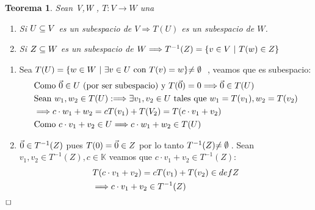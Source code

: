 \documentclass[]{article}
\newtheorem{theorem}{Teorema}
\newenvironment{proof}{\noindent{\bf Prueba:}}{$\hfill \Box$ \vspace{10pt}}
\newcommand{\K}{
    \mathbb{K}
}
\newcommand{\ida}{\Longrightarrow}
\begin{document}
\begin{theorem}
    Sean V,W \espvec , $T:V\to W$ una \tl
    \begin{enumerate}
        \item Si $\text{$U \subseteq V$}$ es un subespacio de $V \ida T(U)$ es un subespacio de $W$.
        \item Si $\text{$Z \subseteq W$}$ es un subespacio de $W \ida T^{-1}(Z)=\conjunto{v \in V \tq T(w)\in Z}$
    \end{enumerate}
\end{theorem}
\begin{proof}
    \begin{enumerate}
        \item Sea $\text{$T({U})$} = \text{$\{ {w \in W \text{ $|$ } \exists v \in U \text{ con } \text{$T({v})$}=w} \}$} \text{$\neq\emptyset$}\:$ , veamos
        que  es subespacio:
        \begin{align*}
            &\text{Como } \cero \in U \text{ (por ser subespacio) y } \T{\cero}=0 \ida \cero \in \T{U}\\
            &\text{Sean } w_1,w_2 \in \T{U}: \ida \exists v_1,v_2 \in U \text{ tales que } w_1=\T{v_1},w_2=\T{v_2}\\
            &\ida c\cdot w_1 + w_2 = c\T{v_1}+\T{V_2} = \T{c\cdot v_1 + v_2}\\
            &\text{Como } c\cdot v_1+v_2 \in U \ida c\cdot w_1 + w_2 \in \T{U}
        \end{align*}
        \item $\text{$\vec{0}$} \in T^{-1}(Z)$ pues $\text{$T({0})$} = \text{$\vec{0}$} \in Z$ por lo tanto $T^{-1}(Z) \text{$\neq\emptyset$}\:$.
        Sean $v_1,v_2 \in T^{-1}(Z) , c \in \K$ veamos que $c\cdot v_1 + v_2 \in T^{-1}(Z)$:
        \begin{align*}
            &\T{c\cdot v_1+v_2}=c\T{v_1}+\T{v_2} \in defZ\\
            &\ida c\cdot v_1+v_2 \in T^{-1}(Z)
        \end{align*}
    \end{enumerate}
\end{proof}
\end{document}
